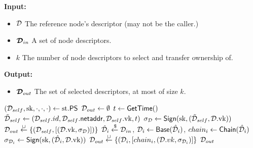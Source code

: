 \begin{algorithm}[H]
\caption{\psselect}
\label{alg:psselect}
\textbf{Input:}
\begin{itemize}
\vspace{-.8em}
\itemsep0em 
    \item $\mathcal{D}$ The reference node's descriptor (may not be the caller.)
    \item $\boldsymbol{\mathcal{D}}_{in}$ A set of node descriptors.
    \item $k$ The number of node descriptors to select and transfer ownership of.
\end{itemize}
\textbf{Output:}
\begin{itemize}
\vspace{-.8em}
\itemsep0em 
    \item $\boldsymbol{\mathcal{D}}_{out}$ The set of selected descriptors, at most of size $k$.
\end{itemize}
\begin{algorithmic}
    \State $(\mathcal{D}_{self},\text{sk},\cdot,\cdot,\cdot) \gets \text{st}.\mathsf{PS}$
    \State $\mathcal{D}_{out} \gets \emptyset$
    \State {} 
    \State $t \gets \mathsf{GetTime}()$
    \State $\tilde{\mathcal{D}}_{self} \gets (\mathcal{D}_{self}.id,\mathcal{D}_{self}.\mathsf{netaddr},\mathcal{D}_{self}.\text{vk},t)$
    \State $\sigma_{\mathcal{D}} \gets \mathsf{Sign}(\text{sk},(\tilde{\mathcal{D}}_{self},\mathcal{D}.\text{vk}))$
    \State $\mathcal{D}_{out} \stackrel{\cup}{\gets} \lbrace (\mathcal{D}_{self},[(\mathcal{D}.\text{vk},\sigma_{\mathcal{D}})]) \rbrace$
    \State {}
    \State $\mathcal{\hat{D}}_i \mathrel{\xleftarrow{\$}} \mathcal{D}_{in}$, $\mathcal{D}_i \gets \mathsf{Base}(\mathcal{\hat{D}}_i)$, $chain_i \gets \mathsf{Chain}(\mathcal{\hat{D}}_i)$
    \State $\sigma_{\mathcal{D}_i} \gets \mathsf{Sign}(\text{sk},(\mathcal{\hat{D}}_i,\mathcal{D}.\text{vk}))$ 
    \State $\mathcal{D}_{out} \stackrel{\cup}{\gets} \lbrace (\mathcal{D}_i,[chain_i,(\mathcal{D}.vk,\sigma_{\mathcal{D}_i})] \rbrace$ 
    \EndFor
    \State \Return $\mathcal{D}_{out}$
\end{algorithmic}
\end{algorithm}

